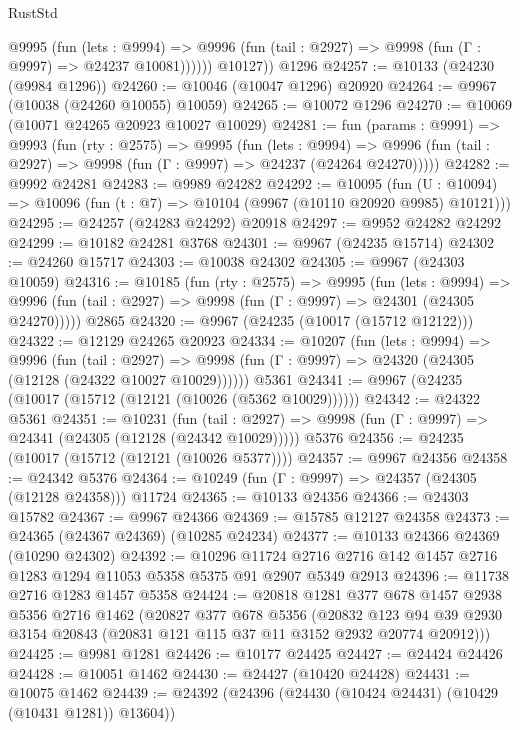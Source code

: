 \begin{lexlean}{RustStd}
\begin{coremodule}
            @9995
              (fun (lets : @9994) =>
              @9996 (fun (tail : @2927) => @9998 (fun (Γ : @9997) => @24237 @10081))))))
        @10127))
    @1296
@24257 := @10133 (@24230 (@9984 @1296))
@24260 := @10046 (@10047 @1296) @20920
@24264 := @9967 (@10038 (@24260 @10055) @10059)
@24265 := @10072 @1296
@24270 := @10069 (@10071 @24265 @20923 @10027 @10029)
@24281 := fun (params : @9991) =>
  @9993
    (fun (rty : @2575) =>
    @9995
      (fun (lets : @9994) =>
      @9996 (fun (tail : @2927) => @9998 (fun (Γ : @9997) => @24237 (@24264 @24270)))))
@24282 := @9992 @24281
@24283 := @9989 @24282
@24292 := @10095
    (fun (U : @10094) => @10096 (fun (t : @7) => @10104 (@9967 (@10110 @20920 @9985) @10121)))
@24295 := @24257 (@24283 @24292) @20918
@24297 := @9952 @24282 @24292
@24299 := @10182 @24281 @3768
@24301 := @9967 (@24235 @15714)
@24302 := @24260 @15717
@24303 := @10038 @24302
@24305 := @9967 (@24303 @10059)
@24316 := @10185
    (fun (rty : @2575) =>
    @9995
      (fun (lets : @9994) =>
      @9996 (fun (tail : @2927) => @9998 (fun (Γ : @9997) => @24301 (@24305 @24270)))))
    @2865
@24320 := @9967 (@24235 (@10017 (@15712 @12122)))
@24322 := @12129 @24265 @20923
@24334 := @10207
    (fun (lets : @9994) =>
    @9996
      (fun (tail : @2927) =>
      @9998 (fun (Γ : @9997) => @24320 (@24305 (@12128 (@24322 @10027 @10029))))))
    @5361
@24341 := @9967 (@24235 (@10017 (@15712 (@12121 (@10026 (@5362 @10029))))))
@24342 := @24322 @5361
@24351 := @10231
    (fun (tail : @2927) => @9998 (fun (Γ : @9997) => @24341 (@24305 (@12128 (@24342 @10029)))))
    @5376
@24356 := @24235 (@10017 (@15712 (@12121 (@10026 @5377))))
@24357 := @9967 @24356
@24358 := @24342 @5376
@24364 := @10249 (fun (Γ : @9997) => @24357 (@24305 (@12128 @24358))) @11724
@24365 := @10133 @24356
@24366 := @24303 @15782
@24367 := @9967 @24366
@24369 := @15785 @12127 @24358
@24373 := @24365 (@24367 @24369) (@10285 @24234)
@24377 := @10133 @24366 @24369 (@10290 @24302)
@24392 := @10296
    @11724
    @2716
    @2716
    @142
    @1457
    @2716
    @1283
    @1294
    @11053
    @5358
    @5375
    @91
    @2907
    @5349
    @2913
@24396 := @11738 @2716 @1283 @1457 @5358
@24424 := @20818
    @1281
    @377
    @678
    @1457
    @2938
    @5356
    @2716
    @1462
    (@20827
      @377
      @678
      @5356
      (@20832 @123 @94 @39 @2930 @3154 @20843 (@20831 @121 @115 @37 @11 @3152 @2932 @20774 @20912)))
@24425 := @9981 @1281
@24426 := @10177 @24425
@24427 := @24424 @24426
@24428 := @10051 @1462
@24430 := @24427 (@10420 @24428)
@24431 := @10075 @1462
@24439 := @24392 (@24396 (@24430 (@10424 @24431) (@10429 (@10431 @1281)) @13604))

\end{coremodule}
\end{lexlean}
